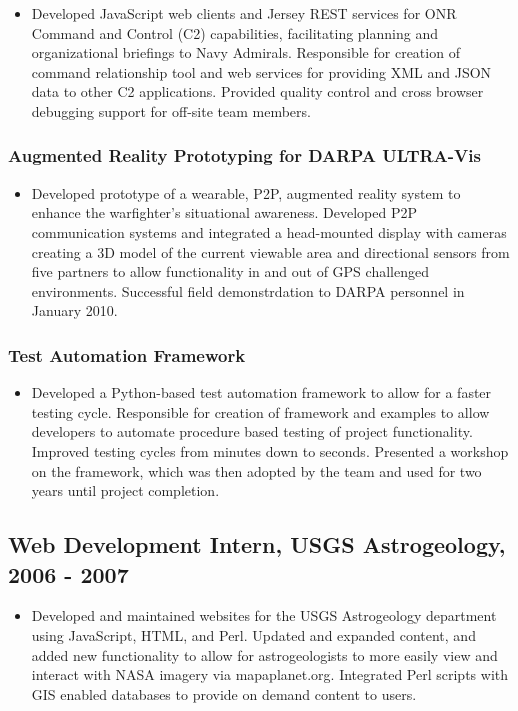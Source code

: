 \documentclass[11pt]{article}
\begin{document}
\begin{itemize}
\item Developed JavaScript web clients and Jersey REST services for ONR Command and Control (C2) capabilities, facilitating planning and organizational briefings to Navy Admirals. Responsible for creation of command relationship tool and web services for providing XML and JSON data to other C2 applications. Provided quality control and cross browser debugging support for off-site team members.
\end{itemize}
\subsubsection*{Augmented Reality Prototyping for DARPA ULTRA-Vis}
\label{sec-1.1.4}

\begin{itemize}
\item Developed prototype of a wearable, P2P, augmented reality system to enhance the warfighter's situational awareness. Developed P2P communication systems and integrated a head-mounted display with cameras creating a 3D model of the current viewable area and directional sensors from five partners to allow functionality in and out of GPS challenged environments. Successful field demonstrdation to DARPA personnel in January 2010.
\end{itemize}
\subsubsection*{Test Automation Framework}
\label{sec-1.1.5}

\begin{itemize}
\item Developed a Python-based test automation framework to allow for a faster testing cycle. Responsible for creation of framework and examples to allow developers to automate procedure based testing of project functionality. Improved testing cycles from minutes down to seconds. Presented a workshop on the framework, which was then adopted by the team and used for two years until project completion.
\end{itemize}
\subsection*{Web Development Intern, USGS Astrogeology, 2006 - 2007}
\label{sec-1.2}

\begin{itemize}
\item Developed and maintained websites for the USGS Astrogeology department using JavaScript, HTML, and Perl. Updated and expanded content, and added new functionality to allow for astrogeologists to more easily view and interact with NASA imagery via mapaplanet.org. Integrated Perl scripts with GIS enabled databases to provide on demand content to users.
\end{itemize}
\end{document}
